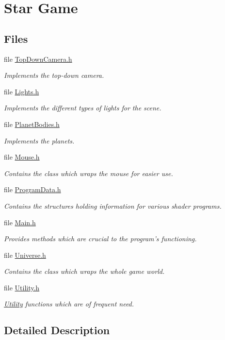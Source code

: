 \hypertarget{group__module___star_game}{\section{Star Game}
\label{group__module___star_game}
}
\subsection*{Files}
\begin{DoxyCompactItemize}
\item 
file \hyperlink{_top_down_camera_8h}{Top\-Down\-Camera.\-h}
\begin{DoxyCompactList}\small\item\em Implements the top-\/down camera. \end{DoxyCompactList}\item 
file \hyperlink{_lights_8h}{Lights.\-h}
\begin{DoxyCompactList}\small\item\em Implements the different types of lights for the scene. \end{DoxyCompactList}\item 
file \hyperlink{_planet_bodies_8h}{Planet\-Bodies.\-h}
\begin{DoxyCompactList}\small\item\em Implements the planets. \end{DoxyCompactList}\item 
file \hyperlink{_mouse_8h}{Mouse.\-h}
\begin{DoxyCompactList}\small\item\em Contains the class which wraps the mouse for easier use. \end{DoxyCompactList}\item 
file \hyperlink{_program_data_8h}{Program\-Data.\-h}
\begin{DoxyCompactList}\small\item\em Contains the structures holding information for various shader programs. \end{DoxyCompactList}\item 
file \hyperlink{_main_8h}{Main.\-h}
\begin{DoxyCompactList}\small\item\em Provides methods which are crucial to the program's functioning. \end{DoxyCompactList}\item 
file \hyperlink{_universe_8h}{Universe.\-h}
\begin{DoxyCompactList}\small\item\em Contains the class which wraps the whole game world. \end{DoxyCompactList}\item 
file \hyperlink{_utility_8h}{Utility.\-h}
\begin{DoxyCompactList}\small\item\em \hyperlink{namespace_utility}{Utility} functions which are of frequent need. \end{DoxyCompactList}\end{DoxyCompactItemize}


\subsection{Detailed Description}
